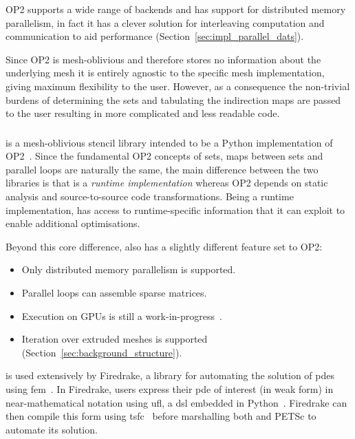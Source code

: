 OP2 supports a wide range of backends and has support for distributed memory parallelism, in fact it has a clever solution for interleaving computation and communication to aid performance (Section~\ref{sec:impl_parallel_dats}).

Since OP2 is mesh-oblivious and therefore stores no information about the underlying mesh it is entirely agnostic to the specific mesh implementation, giving maximum flexibility to the user.
However, as a consequence the non-trivial burdens of determining the sets and tabulating the indirection maps are passed to the user resulting in more complicated and less readable code.

\subsubsection{}

 is a mesh-oblivious stencil library intended to be a Python implementation of OP2~\cite{rathgeberPyOP2HighLevelFramework2012}.
Since the fundamental OP2 concepts of sets, maps between sets and parallel loops are naturally the same, the main difference between the two libraries is that  is a \textit{runtime implementation} whereas OP2 depends on static analysis and source-to-source code transformations.
Being a runtime implementation,  has access to runtime-specific information that it can exploit to enable additional optimisations.

Beyond this core difference,  also has a slightly different feature set to OP2:

\begin{itemize}
  \item
    Only distributed memory parallelism is supported.
  \item
    Parallel loops can assemble sparse matrices.
  \item
    Execution on GPUs is still a work-in-progress~\cite{fenics2021-kulkarni}.
  \item
    Iteration over extruded meshes is supported (Section~\ref{sec:background_structure}).
\end{itemize}

 is used extensively by Firedrake, a library for automating the solution of \glspl{pde} using \gls{fem}~\cite{rathgeberFiredrakeAutomatingFinite2016}.
In Firedrake, users express their \gls{pde} of interest (in weak form) in near-mathematical notation using \gls{ufl}, a \gls{dsl} embedded in Python~\cite{alnaesUnifiedFormLanguage2014a}.
Firedrake can then compile this form using \gls{tsfc}~\cite{homolyaTSFCStructurePreservingForm2018} before marshalling both  and PETSc to automate its solution.

